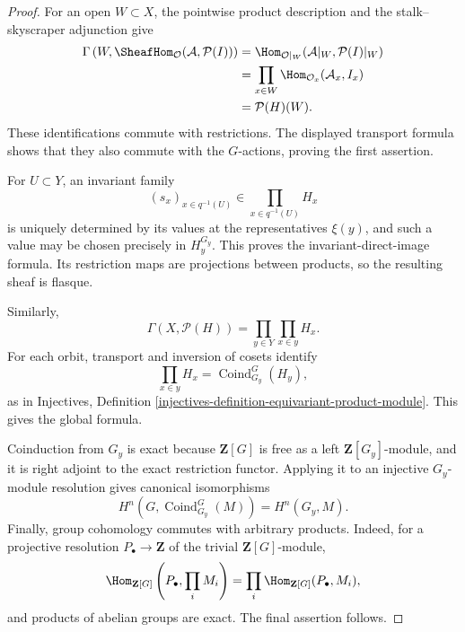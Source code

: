 \begin{proof}
For an open $W\subset X$, the pointwise product description and the
stalk--skyscraper adjunction give
$$
\begin{aligned}
\Gamma\left(
W,\SheafHom_{\mathcal O}(\mathcal A,\mathcal P(I))
\right)
&=
\Hom_{\mathcal O|_W}
(\mathcal A|_W,\mathcal P(I)|_W) \\
&=
\prod_{x\in W}
\Hom_{\mathcal O_x}(\mathcal A_x,I_x) \\
&=
\mathcal P(H)(W).
\end{aligned}
$$
These identifications commute with restrictions. The displayed transport
formula shows that they also commute with the $G$-actions, proving the
first assertion.

For $U\subset Y$, an invariant family
$$
(s_x)_{x\in q^{-1}(U)}\in\prod_{x\in q^{-1}(U)}H_x
$$
is uniquely determined by its values at the representatives $\xi(y)$,
and such a value may be chosen precisely in $H_y^{G_y}$. This proves the
invariant-direct-image formula. Its restriction maps are projections
between products, so the resulting sheaf is flasque.

Similarly,
$$
\Gamma(X,\mathcal P(H))
=
\prod_{y\in Y}\prod_{x\in y}H_x.
$$
For each orbit, transport and inversion of cosets identify
$$
\prod_{x\in y}H_x
=
\operatorname{Coind}_{G_y}^G(H_y),
$$
as in Injectives, Definition
\ref{injectives-definition-equivariant-product-module}. This gives the
global formula.

Coinduction from $G_y$ is exact because $\mathbf Z[G]$ is free as a left
$\mathbf Z[G_y]$-module, and it is right adjoint to the exact restriction
functor. Applying it to an injective $G_y$-module resolution gives
canonical isomorphisms
$$
H^n\left(G,\operatorname{Coind}_{G_y}^G(M)\right)
=
H^n(G_y,M).
$$
Finally, group cohomology commutes with arbitrary products. Indeed, for a
projective resolution $P_\bullet\to\mathbf Z$ of the trivial
$\mathbf Z[G]$-module,
$$
\Hom_{\mathbf Z[G]}
\left(P_\bullet,\prod_iM_i\right)
=
\prod_i\Hom_{\mathbf Z[G]}(P_\bullet,M_i),
$$
and products of abelian groups are exact. The final assertion follows.
\end{proof}


